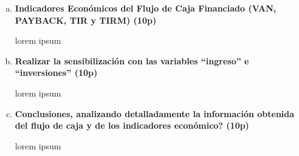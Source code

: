 \begin{enumerate}[(a)]
\begin{table}[h!t]
\begin{tabular}{|l|r|r|r|r|}
                \end{tabular}
                
            \end{table}
\newpage
    \item {\bf Indicadores Económicos  del Flujo de Caja Financiado (VAN, PAYBACK, TIR y TIRM) (10p)}


          lorem ipsum

\newpage
    \item {\bf Realizar la sensibilización con las variables “ingreso” e “inversiones” (10p)}


          lorem ipsum

\newpage
    \item {\bf Conclusiones, analizando detalladamente la información obtenida del flujo de caja y de los indicadores económico? (10p)}


          lorem ipsum

\end{enumerate}
